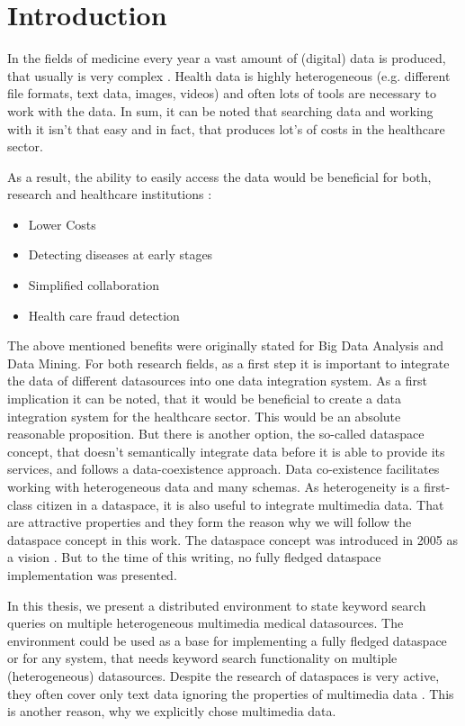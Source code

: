 \chapter{Introduction}

In the fields of medicine every year a vast amount of (digital) data is produced, that usually is very complex \cite[p. 1]{ASurveyOnDataMiningApproachesForHealthcare}. Health data is highly heterogeneous (e.g. different file formats, text data, images, videos) and often lots of tools are necessary to work with the data\cite[p. 1]{Raghupathi2014}. In sum, it can be noted that searching data and working with it isn't that easy and in fact, that produces lot's of costs in the healthcare sector.  

As a result, the ability to easily access the data would be beneficial for both, research and healthcare institutions \cite[p. 2]{Raghupathi2014}:
\begin{itemize}
	\item Lower Costs
	\item Detecting diseases at early stages
	\item Simplified collaboration
	\item Health care fraud detection
\end{itemize}

The above mentioned benefits were originally stated for Big Data Analysis and Data Mining. For both research fields, as a first step it is important to integrate the data of different datasources into one data integration system. As a first implication it can be noted, that it would be beneficial to create a data integration system for the healthcare sector. This would be an absolute reasonable proposition. But there is another option, the so-called dataspace concept, that doesn't semantically integrate data before it is able to provide its services, and follows a data-coexistence approach. Data co-existence facilitates working with heterogeneous data and many schemas. As heterogeneity is a first-class citizen in a dataspace, it is also useful to integrate multimedia data. That are attractive properties and they form the reason why we will follow the dataspace concept in this work.
The dataspace concept was introduced in 2005 as a vision \cite{Franklin:2005:DDN:1107499.1107502}. But to the time of this writing, no fully fledged dataspace implementation was presented. 

In this thesis, we present a distributed environment to state keyword search queries on multiple heterogeneous multimedia medical datasources. The environment could be used as a base for implementing a fully fledged dataspace or for any system, that needs keyword search functionality on multiple (heterogeneous) datasources. Despite the research of dataspaces is very active, they often cover only text data ignoring the properties of multimedia data \cite{6167826}. This is another reason, why we explicitly chose multimedia data.

